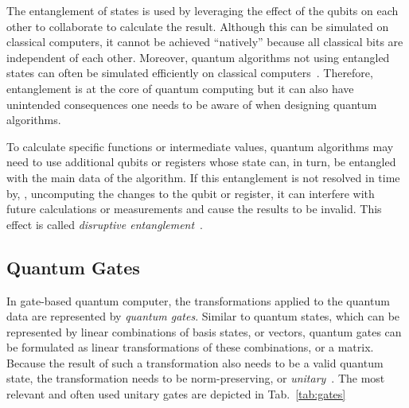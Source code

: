 The entanglement of states is used by leveraging the effect of the qubits on each other to collaborate to calculate the result. Although this can be simulated on classical computers, it cannot be achieved ``natively'' because all classical bits are independent of each other. Moreover, quantum algorithms not using entangled states can often be simulated efficiently on classical computers~\cite{MHH19}. Therefore, entanglement is at the core of quantum computing but it can also have unintended consequences one needs to be aware of when designing quantum algorithms.

To calculate specific functions or intermediate values, quantum algorithms may need to use additional qubits or registers whose state can, in turn, be entangled with the main data of the algorithm. If this entanglement is not resolved in time by, \eg, uncomputing the changes to the qubit or register, it can interfere with future calculations or measurements and cause the results to be invalid. This effect is called \emph{disruptive entanglement}~\cite{YVC24}.

\subsection{Quantum Gates}
\label{sec:background_quantumGates}
In gate-based quantum computer, the transformations applied to the quantum data are represented by \emph{quantum gates}. Similar to quantum states, which can be represented by linear combinations of basis states, or vectors, quantum gates can be formulated as linear transformations of these combinations, or a matrix. Because the result of such a transformation also needs to be a valid quantum state, the transformation needs to be norm-preserving, or \emph{unitary}~\cite{DiCh20a}. The most relevant and often used unitary gates are depicted in Tab.~\ref{tab:gates}

